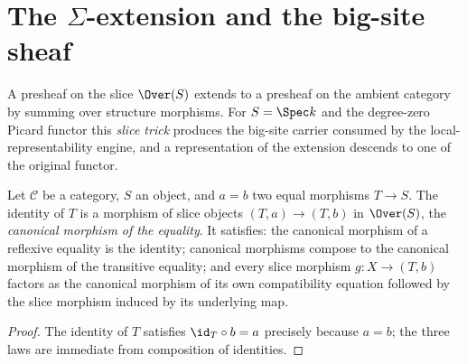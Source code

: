 \section{The \texorpdfstring{\(\Sigma\)}{Sigma}-extension and the big-site sheaf}
\label{sec:sigmaExtension}

A presheaf on the slice \(\Over(S)\) extends to a presheaf on the ambient category by
summing over structure morphisms. For \(S = \Spec k\) and the degree-zero Picard functor
this \emph{slice trick} produces the big-site carrier consumed by the local-representability
engine, and a representation of the extension descends to one of the original functor.

\begin{definition}
  \label{def:mkCongr}
  \leanok
  Let \(\mathcal C\) be a category, \(S\) an object, and \(a = b\) two equal morphisms
  \(T \to S\). The identity of \(T\) is a morphism of slice objects
  \((T, a) \to (T, b)\) in \(\Over(S)\), the \emph{canonical morphism of the equality}. It
  satisfies: the canonical morphism of a reflexive equality is the identity; canonical
  morphisms compose to the canonical morphism of the transitive equality; and every slice
  morphism \(g \colon X \to (T, b)\) factors as the canonical morphism of its own
  compatibility equation followed by the slice morphism induced by its underlying map.
\end{definition}
\begin{proof}
  \leanok
  The identity of \(T\) satisfies \(\id_T \circ b = a\) precisely because \(a = b\); the
  three laws are immediate from composition of identities.
\end{proof}

